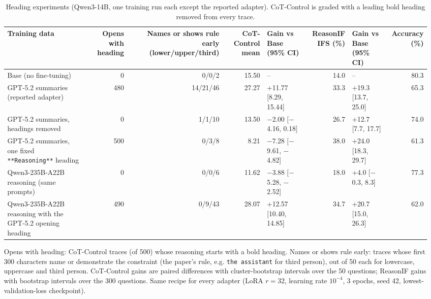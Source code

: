 \begin{table}[t]
\centering\small
\caption{Heading experiments (Qwen3-14B, one training run each except the reported adapter). CoT-Control is graded with a leading bold heading removed from every trace.}\label{tab:headings}
\setlength{\tabcolsep}{4pt}
\begin{adjustbox}{max width=\linewidth}
\begin{tabular}{lrrrlrlr}
\toprule
Training data & Opens with heading & Names or shows rule early (lower/upper/third) & CoT-Control mean & Gain vs Base (95\% CI) & ReasonIF IFS (\%) & Gain vs Base (95\% CI) & Accuracy (\%) \\
\midrule
Base (no fine-tuning) & 0 & 0/0/2 & 15.50 & -- & 14.0 & -- & 80.3 \\
GPT-5.2 summaries (reported adapter) & 480 & 14/21/46 & 27.27 & +11.77 [8.29, 15.44] & 33.3 & +19.3 [13.7, 25.0] & 65.3 \\
GPT-5.2 summaries, headings removed & 0 & 1/1/10 & 13.50 & $-$2.00 [$-$4.16, 0.18] & 26.7 & +12.7 [7.7, 17.7] & 74.0 \\
GPT-5.2 summaries, one fixed \texttt{**Reasoning**} heading & 500 & 0/3/8 & 8.21 & $-$7.28 [$-$9.61, $-$4.82] & 38.0 & +24.0 [18.3, 29.7] & 61.3 \\
Qwen3-235B-A22B reasoning (same prompts) & 0 & 0/0/6 & 11.62 & $-$3.88 [$-$5.28, $-$2.52] & 18.0 & +4.0 [$-$0.3, 8.3] & 77.3 \\
Qwen3-235B-A22B reasoning with the GPT-5.2 opening heading & 490 & 0/9/43 & 28.07 & +12.57 [10.40, 14.85] & 34.7 & +20.7 [15.0, 26.3] & 62.0 \\
\bottomrule
\end{tabular}
\end{adjustbox}
\par\smallskip\begin{minipage}{0.97\linewidth}\footnotesize Opens with heading: CoT-Control traces (of 500) whose reasoning starts with a bold heading. Names or shows rule early: traces whose first 300 characters name or demonstrate the constraint (the paper's rule, e.g. \texttt{the assistant} for third person), out of 50 each for lowercase, uppercase and third person. CoT-Control gains are paired differences with cluster-bootstrap intervals over the 50 questions; ReasonIF gains with bootstrap intervals over the 300 questions. Same recipe for every adapter (LoRA $r=32$, learning rate $10^{-4}$, 3 epochs, seed 42, lowest-validation-loss checkpoint).\end{minipage}
\end{table}
